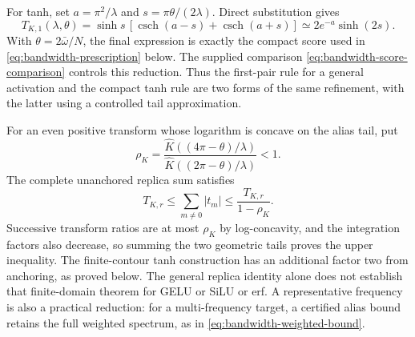 For tanh, set $a=\pi^2/\lambda$ and
$s=\pi\theta/(2\lambda)$. Direct substitution gives
\begin{equation}
 T_{K,1}(\lambda,\theta)
 =\sinh s\,[\operatorname{csch}(a-s)+\operatorname{csch}(a+s)]
 \simeq2e^{-a}\sinh(2s).
 \label{eq:bw-tanh-reduction}
\end{equation}
With $\theta=2\bar\omega/N$, the final expression is exactly the compact
score used in \eqref{eq:bandwidth-prescription} below. The supplied
comparison \eqref{eq:bandwidth-score-comparison} controls this reduction.
Thus the first-pair rule for a general activation and the compact tanh rule
are two forms of the same refinement, with the latter using a controlled
tail approximation.

For an even positive transform whose logarithm is concave on the alias
tail, put
\[
 \rho_K=
 \frac{\widehat K((4\pi-\theta)/\lambda)}
      {\widehat K((2\pi-\theta)/\lambda)}<1.
\]
The complete unanchored replica sum satisfies
\begin{equation}
 T_{K,r}\le\sum_{m\ne0}|t_m|
 \le\frac{T_{K,r}}{1-\rho_K}.
 \label{eq:bw-tail-control}
\end{equation}
Successive transform ratios are at most $\rho_K$ by log-concavity, and the
integration factors also decrease, so summing the two geometric tails
proves the upper inequality. The finite-contour tanh construction has an
additional factor two from anchoring, as proved below. The general replica
identity alone does not establish that finite-domain theorem for GELU or
SiLU or erf. A representative frequency is also a practical reduction: for a
multi-frequency target, a certified alias bound retains the full weighted
spectrum, as in \eqref{eq:bandwidth-weighted-bound}.

